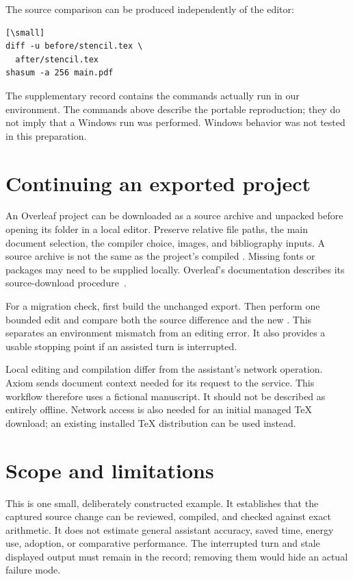 \documentclass{ltugboat}
\begin{document}
The source comparison can be produced independently of the editor:
\begin{verbatim}[\small]
diff -u before/stencil.tex \
  after/stencil.tex
shasum -a 256 main.pdf
\end{verbatim}
The supplementary record contains the commands actually run in our
environment. The commands above describe the portable reproduction;
they do not imply that a Windows run was performed. Windows behavior
was not tested in this preparation.

\section{Continuing an exported project}
An Overleaf project can be downloaded as a source archive and unpacked
before opening its folder in a local editor. Preserve relative file
paths, the main document selection, the compiler choice, images, and
bibliography inputs. A source archive is not the same as the project's
compiled \acro{PDF}. Missing fonts or packages may need to be supplied
locally. Overleaf's documentation describes its source-download
procedure~\cite{overleaf}.

For a migration check, first build the unchanged export. Then perform
one bounded edit and compare both the source difference and the new
\acro{PDF}. This separates an environment mismatch from an editing
error. It also provides a usable stopping point if an assisted turn is
interrupted.

Local editing and compilation differ from the assistant's network
operation. Axiom sends document context needed for its request to the
service. This workflow therefore uses a fictional manuscript. It
should not be described as entirely offline. Network access is also
needed for an initial managed \TeX{} download; an existing installed
\TeX{} distribution can be used instead.

\section{Scope and limitations}
This is one small, deliberately constructed example. It establishes
that the captured source change can be reviewed, compiled, and checked
against exact arithmetic. It does not estimate general assistant
accuracy, saved time, energy use, adoption, or comparative performance.
The interrupted turn and stale displayed output must remain in the
record; removing them would hide an actual failure mode.
\end{document}
